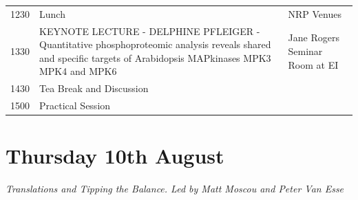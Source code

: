 \documentclass[12pt,]{book}
\theoremstyle{definition}
\theoremstyle{definition}
\theoremstyle{remark}
\begin{document}
\begin{longtable}[]{@{}lll@{}}
\begin{minipage}[t]{0.09\columnwidth}
1230\strut
\end{minipage} & \begin{minipage}[t]{0.38\columnwidth}\raggedright\strut
Lunch\strut
\end{minipage} & \begin{minipage}[t]{0.38\columnwidth}\raggedright\strut
NRP Venues\strut
\end{minipage}\tabularnewline
\begin{minipage}[t]{0.09\columnwidth}\raggedright\strut
1330\strut
\end{minipage} & \begin{minipage}[t]{0.38\columnwidth}\raggedright\strut
KEYNOTE LECTURE - DELPHINE PFLEIGER - Quantitative phosphoproteomic
analysis reveals shared and specific targets of Arabidopsis MAPkinases
MPK3 MPK4 and MPK6\strut
\end{minipage} & \begin{minipage}[t]{0.38\columnwidth}\raggedright\strut
Jane Rogers Seminar Room at EI\strut
\end{minipage}\tabularnewline
\begin{minipage}[t]{0.09\columnwidth}\raggedright\strut
1430\strut
\end{minipage} & \begin{minipage}[t]{0.38\columnwidth}\raggedright\strut
Tea Break and Discussion\strut
\end{minipage} & \begin{minipage}[t]{0.38\columnwidth}\raggedright\strut
\strut
\end{minipage}\tabularnewline
\begin{minipage}[t]{0.09\columnwidth}\raggedright\strut
1500\strut
\end{minipage} & \begin{minipage}[t]{0.38\columnwidth}\raggedright\strut
Practical Session\strut
\end{minipage} & \begin{minipage}[t]{0.38\columnwidth}\raggedright\strut
\strut
\end{minipage}\tabularnewline
\bottomrule
\end{longtable}

\section*{Thursday 10th August}\label{thursday-10th-august}

\emph{Translations and Tipping the Balance. Led by Matt Moscou and Peter
Van Esse}
\end{document}
